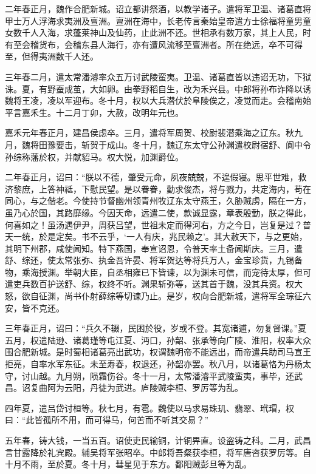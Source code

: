 \documentclass[12pt,UTF8]{ctexbook}
\begin{document}
二年春正月，魏作合肥新城。诏立都讲祭酒，以教学诸子。遣将军卫温、诸葛直将甲士万人浮海求夷洲及亶洲。亶洲在海中，长老传言秦始皇帝遣方士徐福将童男童女数千人入海，求蓬莱神山及仙药，止此洲不还。世相承有数万家，其上人民，时有至会稽货布，会稽东县人海行，亦有遭风流移至亶洲者。所在绝远，卒不可得至，但得夷洲数千人还。

三年春二月，遣太常潘濬率众五万讨武陵蛮夷。卫温、诸葛直皆以违诏无功，下狱诛。夏，有野蚕成茧，大如卵。由拳野稻自生，改为禾兴县。中郎将孙布诈降以诱魏将王凌，凌以军迎布。冬十月，权以大兵潜伏於阜陵俟之，凌觉而走。会稽南始平言嘉禾生。十二月丁卯，大赦，改明年元也。

嘉禾元年春正月，建昌侯虑卒。三月，遣将军周贺、校尉裴潜乘海之辽东。秋九月，魏将田豫要击，斩贺于成山。冬十月，魏辽东太守公孙渊遣校尉宿舒、阆中令孙综称藩於权，并献貂马。权大悦，加渊爵位。

二年春正月，诏曰：“朕以不德，肇受元命，夙夜兢兢，不遑假寝。思平世难，救济黎庶，上答神祗，下慰民望。是以眷眷，勤求俊杰，将与戮力，共定海内，苟在同心，与之偕老。今使持节督幽州领青州牧辽东太守燕王，久胁贼虏，隔在一方，虽乃心於国，其路靡缘。今因天命，远遣二使，款诚显露，章表殷勤，朕之得此，何喜如之！虽汤遇伊尹，周获吕望，世祖未定而得河右，方之今日，岂复是过？普天一统，於是定矣。书不云乎，‘一人有庆，兆民赖之’。其大赦天下，与之更始，其明下州郡，咸使闻知。特下燕国，奉宣诏恩，令普天率土备闻斯庆。三月，遣舒、综还，使太常张弥、执金吾许晏、将军贺达等将兵万人，金宝珍货，九锡备物，乘海授渊。举朝大臣，自丞相雍已下皆谏，以为渊未可信，而宠待太厚，但可遣吏兵数百护送舒、综，权终不听。渊果斩弥等，送其首于魏，没其兵资。权大怒，欲自征渊，尚书仆射薛综等切谏乃止。是岁，权向合肥新城，遣将军全琮征六安，皆不克还。

三年春正月，诏曰：“兵久不辍，民困於役，岁或不登。其宽诸逋，勿复督课。”夏五月，权遣陆逊、诸葛瑾等屯江夏、沔口，孙韶、张承等向广陵、淮阳，权率大众围合肥新城。是时蜀相诸葛亮出武功，权谓魏明帝不能远出，而帝遣兵助司马宣王拒亮，自率水军东征。未至寿春，权退还，孙韶亦罢。秋八月，以诸葛恪为丹杨太守，讨山越。九月朔，陨霜伤谷。冬十一月，太常潘濬平武陵蛮夷，事毕，还武昌。诏复曲阿为云阳，丹徒为武进。庐陵贼李桓、罗厉等为乱。

四年夏，遣吕岱讨桓等。秋七月，有雹。魏使以马求易珠玑、翡翠、玳瑁，权曰：“此皆孤所不用，而可得马，何苦而不听其交易？”

五年春，铸大钱，一当五百。诏使吏民输铜，计铜畀直。设盗铸之科。二月，武昌言甘露降於礼宾殿。辅吴将军张昭卒。中郎将吾粲获李桓，将军唐咨获罗厉等。自十月不雨，至於夏。冬十月，彗星见于东方。鄱阳贼彭旦等为乱。
\end{document}

